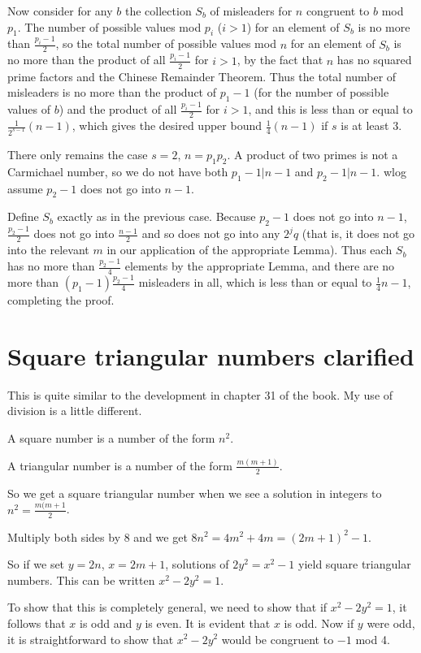 \documentclass[12pt]{article}
\begin{document}
Now consider for any $b$ the collection $S_b$ of misleaders for $n$ congruent to $b$ mod $p_1$.
The number of possible values mod $p_i$ ($i>1$) for an element of $S_b$ is  no more than $\frac{p_i-1}2$, so the total number of possible values mod $n$ for an element of $S_b$ is no more than the product of all $\frac{p_i-1}2$ for $i>1$, by the fact that $n$ has no squared prime factors and the Chinese Remainder Theorem.
Thus the total number of misleaders is no more than the product of $p_1-1$ (for the number of possible
values of $b$) and the product of all $\frac{p_i-1}2$ for $i>1$, and this is less than or equal to
$\frac1{2^{s-1}}(n-1)$, which gives the desired upper bound $\frac 14(n-1)$ if $s$ is at least 3.

There only remains the case $s=2$, $n=p_1p_2$.  A product of two primes is not a Carmichael number, so we do not have both $p_1-1|n-1$ and $p_2-1|n-1$.  wlog assume $p_2-1$ does not go into $n-1$.

Define $S_b$ exactly as in the previous case.   Because $p_2-1$ does not go into $n-1$,
$\frac{p_2-1}2$ does not go into $\frac{n-1}2$ and so does not go into any $2^jq$ (that is, it does not go into the relevant $m$ in our application of the appropriate Lemma).  Thus each $S_b$ has no more than $\frac{p_2-1}4$ elements by the appropriate Lemma, and there are no more than $(p_1-1)\frac{p_2-1}4$ misleaders in all, which is  less than or equal to
$\frac14{n-1}$, completing the proof.

\section{Square triangular numbers clarified}

This is quite similar to the development in chapter 31 of the book.  My use of division is a little different.

A square number is a number of the form $n^2$.

A triangular number is a number of the form $\frac{m(m+1)}2$.

So we get a square triangular number when we see a solution in integers to $n^2=\frac{m(m+1}2$.

Multiply both sides by 8 and we get $8n^2 = 4m^2+4m = (2m+1)^2-1$.

So if we set $y=2n$, $x=2m+1$, solutions of $2y^2= x^2-1$ yield square triangular numbers.  This can be written
$x^2-2y^2=1$.

To show that this is completely general, we need to show that if $x^2-2y^2=1$, it follows that $x$ is odd and $y$ is even.
It is evident that $x$ is odd.  Now if $y$ were odd, it is straightforward to show that $x^2-2y^2$ would be congruent to $-1$ mod 4.
\end{document}
